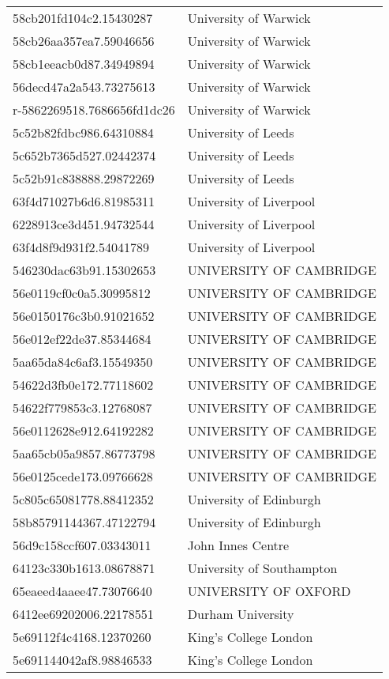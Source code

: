 \begin{tabular}{ll}
58cb201fd104c2.15430287 & University of Warwick \\
58cb26aa357ea7.59046656 & University of Warwick \\
58cb1eeacb0d87.34949894 & University of Warwick \\
56decd47a2a543.73275613 & University of Warwick \\
r-5862269518.7686656fd1dc26 & University of Warwick \\
5c52b82fdbc986.64310884 & University of Leeds \\
5c652b7365d527.02442374 & University of Leeds \\
5c52b91c838888.29872269 & University of Leeds \\
63f4d71027b6d6.81985311 & University of Liverpool \\
6228913ce3d451.94732544 & University of Liverpool \\
63f4d8f9d931f2.54041789 & University of Liverpool \\
546230dac63b91.15302653 & UNIVERSITY OF CAMBRIDGE \\
56e0119cf0c0a5.30995812 & UNIVERSITY OF CAMBRIDGE \\
56e0150176c3b0.91021652 & UNIVERSITY OF CAMBRIDGE \\
56e012ef22de37.85344684 & UNIVERSITY OF CAMBRIDGE \\
5aa65da84c6af3.15549350 & UNIVERSITY OF CAMBRIDGE \\
54622d3fb0e172.77118602 & UNIVERSITY OF CAMBRIDGE \\
54622f779853c3.12768087 & UNIVERSITY OF CAMBRIDGE \\
56e0112628e912.64192282 & UNIVERSITY OF CAMBRIDGE \\
5aa65cb05a9857.86773798 & UNIVERSITY OF CAMBRIDGE \\
56e0125cede173.09766628 & UNIVERSITY OF CAMBRIDGE \\
5c805c65081778.88412352 & University of Edinburgh \\
58b85791144367.47122794 & University of Edinburgh \\
56d9c158ccf607.03343011 & John Innes Centre \\
64123c330b1613.08678871 & University of Southampton \\
65eaeed4aaee47.73076640 & UNIVERSITY OF OXFORD \\
6412ee69202006.22178551 & Durham University \\
5e69112f4c4168.12370260 & King's College London \\
5e691144042af8.98846533 & King's College London \\

\end{tabular}
